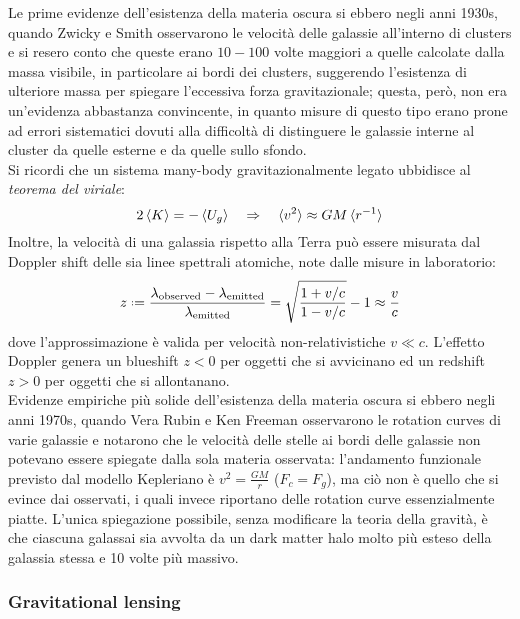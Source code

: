 Le prime evidenze dell'esistenza della materia oscura si ebbero negli anni 1930s, quando Zwicky e Smith osservarono le velocità delle galassie all'interno di clusters e si resero conto che queste erano $ 10-100 $ volte maggiori a quelle calcolate dalla massa visibile, in particolare ai bordi dei clusters, suggerendo l'esistenza di ulteriore massa per spiegare l'eccessiva forza gravitazionale; questa, però, non era un'evidenza abbastanza convincente, in quanto misure di questo tipo erano prone ad errori sistematici dovuti alla difficoltà di distinguere le galassie interne al cluster da quelle esterne e da quelle sullo sfondo.\\
Si ricordi che un sistema many-body gravitazionalmente legato ubbidisce al \textit{teorema del viriale}:
\begin{equation}
	2 \braket{K} = - \braket{U_g}
	\quad \Rightarrow \quad
	\braket{v^2} \approx G M \braket{r^{-1}}
	\label{eq:11.1}
\end{equation}
Inoltre, la velocità di una galassia rispetto alla Terra può essere misurata dal Doppler shift delle sia linee spettrali atomiche, note dalle misure in laboratorio:
\begin{equation}
	z \defeq \frac{\lambda_{\text{observed}} - \lambda_{\text{emitted}}}{\lambda_{\text{emitted}}} = \sqrt{\frac{1 + v/c}{1 - v/c}} - 1 \approx \frac{v}{c}
	\label{eq:11.2}
\end{equation}
dove l'approssimazione è valida per velocità non-relativistiche $ v \ll c $. L'effetto Doppler genera un blueshift $ z < 0 $ per oggetti che si avvicinano ed un redshift $ z > 0 $ per oggetti che si allontanano.\\
Evidenze empiriche più solide dell'esistenza della materia oscura si ebbero negli anni 1970s, quando Vera Rubin e Ken Freeman osservarono le rotation curves di varie galassie e notarono che le velocità delle stelle ai bordi delle galassie non potevano essere spiegate dalla sola materia osservata: l'andamento funzionale previsto dal modello Kepleriano è $ v^2 = \frac{GM}{r} $ ($ F_c = F_g $), ma ciò non è quello che si evince dai osservati, i quali invece riportano delle rotation curve essenzialmente piatte. L'unica spiegazione possibile, senza modificare la teoria della gravità, è che ciascuna galassai sia avvolta da un dark matter halo molto più esteso della galassia stessa e 10 volte più massivo.

\subsubsection{Gravitational lensing}

